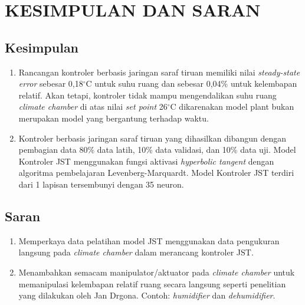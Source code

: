 \chapter{KESIMPULAN DAN SARAN}
\label{kesimpulan-dan-saran}

\section{Kesimpulan}

\begin{enumerate}
	\item  Rancangan kontroler berbasis jaringan saraf tiruan memiliki nilai \textit{steady-state error} sebesar 0,18$^\circ$C untuk suhu ruang dan sebesar 0,04\% untuk kelembapan relatif. Akan tetapi, kontroler tidak mampu mengendalikan suhu ruang \textit{climate chamber} di atas nilai \textit{set point} 26$^\circ$C dikarenakan model plant\cite{skripsiTanto} bukan merupakan model yang bergantung terhadap waktu.
	\item Kontroler berbasis jaringan saraf tiruan yang dihasilkan dibangun dengan pembagian data 80\% data latih, 10\% data validasi, dan 10\% data uji. Model Kontroler JST menggunakan fungsi aktivasi \textit{hyperbolic tangent} dengan algoritma pembelajaran Levenberg-Marquardt. Model Kontroler JST terdiri dari 1 lapisan tersembunyi dengan 35 neuron.
\end{enumerate}

\section{Saran}

\begin{enumerate}
	\item Memperkaya data pelatihan model JST menggunakan data pengukuran langsung pada \textit{climate chamber} dalam merancang kontroler JST.
	\item Menambahkan semacam manipulator/aktuator pada \textit{climate chamber} untuk memanipulasi kelembapan relatif ruang secara langsung seperti penelitian yang dilakukan oleh Jan Drgona\cite{paper22JanDrgona}. Contoh: \textit{humidifier} dan \textit{dehumidifier}.
\end{enumerate}